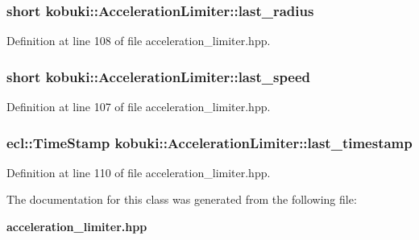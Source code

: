 \subsubsection[{last\-\_\-radius}]{\setlength{\rightskip}{0pt plus 5cm}short {\bf kobuki\-::\-Acceleration\-Limiter\-::last\-\_\-radius}\hspace{0.3cm}{\ttfamily  [private]}}\label{classkobuki_1_1AccelerationLimiter_af59e262cc5235e5143b9a5e47e9b0900}


\-Definition at line 108 of file acceleration\-\_\-limiter.\-hpp.

\subsubsection[{last\-\_\-speed}]{\setlength{\rightskip}{0pt plus 5cm}short {\bf kobuki\-::\-Acceleration\-Limiter\-::last\-\_\-speed}\hspace{0.3cm}{\ttfamily  [private]}}\label{classkobuki_1_1AccelerationLimiter_a44e4b57394fdb2ec79d93077d733a3cb}


\-Definition at line 107 of file acceleration\-\_\-limiter.\-hpp.

\subsubsection[{last\-\_\-timestamp}]{\setlength{\rightskip}{0pt plus 5cm}ecl\-::\-Time\-Stamp {\bf kobuki\-::\-Acceleration\-Limiter\-::last\-\_\-timestamp}\hspace{0.3cm}{\ttfamily  [private]}}\label{classkobuki_1_1AccelerationLimiter_aa09a6b30cb4807218a8c611a763c1314}


\-Definition at line 110 of file acceleration\-\_\-limiter.\-hpp.



\-The documentation for this class was generated from the following file\-:\begin{DoxyCompactItemize}
\item 
{\bf acceleration\-\_\-limiter.\-hpp}\end{DoxyCompactItemize}
